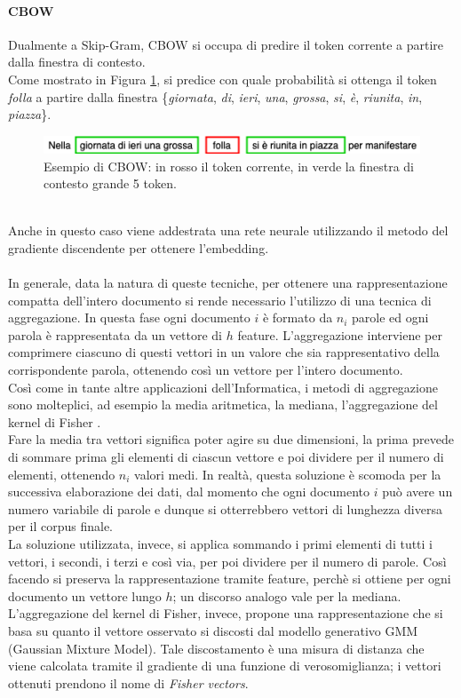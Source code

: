 \documentclass[12pt]{report}
\theoremstyle{definition}
\begin{document}
\paragraph{CBOW}
Dualmente a Skip-Gram, CBOW si occupa di predire il token corrente a partire dalla finestra di contesto.
\\
Come mostrato in Figura \ref{cbow}, si predice con quale probabilità si ottenga il token \textit{folla} a partire dalla finestra \{\textit{giornata}, \textit{di}, \textit{ieri}, \textit{una}, \textit{grossa}, \textit{si}, \textit{è}, \textit{riunita}, \textit{in}, \textit{piazza}\}.
\\
\begin{figure}
    \centering
    \includegraphics[scale = 0.7]{images/cbow.png}
    \caption{Esempio di CBOW: in rosso il token corrente, in verde la finestra di contesto grande 5 token.}
    \label{cbow}
\end{figure}
\\
Anche in questo caso viene addestrata una rete neurale utilizzando il metodo del gradiente discendente per ottenere l'embedding.
\\
\\
In generale, data la natura di queste tecniche, per ottenere una rappresentazione compatta dell'intero documento si rende necessario l'utilizzo di una tecnica di aggregazione.
In questa fase ogni documento $i$ è formato da $n_i$ parole ed ogni parola è rappresentata da un vettore di $h$ feature. L'aggregazione interviene per comprimere ciascuno di questi vettori in un valore che sia rappresentativo della corrispondente parola, ottenendo così un vettore per l'intero documento.
\\
Così come in tante altre applicazioni dell'Informatica, i metodi di aggregazione sono molteplici, ad esempio la media aritmetica, la mediana, l'aggregazione del kernel di Fisher \cite{19}.
\\
Fare la media tra vettori significa poter agire su due dimensioni, la prima prevede di sommare prima gli elementi di ciascun vettore e poi dividere per il numero di elementi, ottenendo $n_i$ valori medi. In realtà, questa soluzione è scomoda per la successiva elaborazione dei dati, dal momento che ogni documento $i$ può avere un numero variabile di parole e dunque si otterrebbero vettori di lunghezza diversa per il corpus finale.
\\
La soluzione utilizzata, invece, si applica sommando i primi elementi di tutti i vettori, i secondi, i terzi e così via, per poi dividere per il numero di parole. Così facendo si preserva la rappresentazione tramite feature, perchè si ottiene per ogni documento un vettore lungo $h$; un discorso analogo vale per la mediana.
\\
L'aggregazione del kernel di Fisher, invece, propone una rappresentazione che si basa su quanto il vettore osservato si discosti dal modello generativo GMM (Gaussian Mixture Model). Tale discostamento è una misura di distanza che viene calcolata tramite il gradiente di una funzione di verosomiglianza; i vettori ottenuti prendono il nome di \textit{Fisher vectors}.
\end{document}
